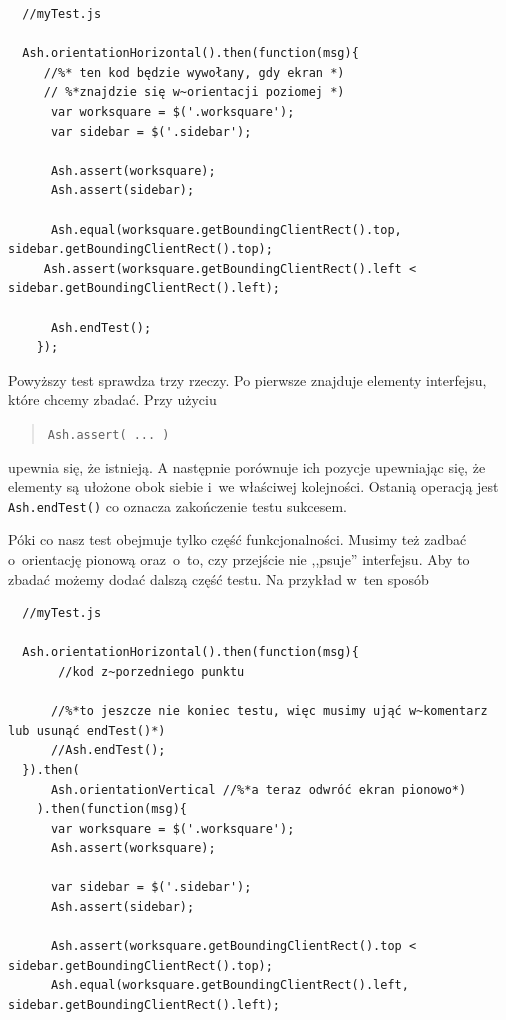 \documentclass[brudnopis]{xmgr}
\begin{document}
\begin{enumerate}
 \begin{lstlisting}
  //myTest.js

  Ash.orientationHorizontal().then(function(msg){
     //%* ten kod będzie wywołany, gdy ekran *) 
     // %*znajdzie się w~orientacji poziomej *)
      var worksquare = $('.worksquare');
      var sidebar = $('.sidebar');

      Ash.assert(worksquare);
      Ash.assert(sidebar);

      Ash.equal(worksquare.getBoundingClientRect().top, sidebar.getBoundingClientRect().top);
     Ash.assert(worksquare.getBoundingClientRect().left < sidebar.getBoundingClientRect().left);

      Ash.endTest();
    });  
\end{lstlisting}

Powyższy test sprawdza trzy rzeczy. Po pierwsze znajduje elementy interfejsu, które chcemy zbadać. Przy użyciu 

\begin{quote}
  \texttt{Ash.assert( ... )} 
\end{quote}

upewnia się, że istnieją. A następnie porównuje ich pozycje upewniając się, że elementy są ułożone obok siebie i~we właściwej kolejności. Ostanią operacją jest \texttt{Ash.endTest()} co oznacza zakończenie testu sukcesem.

Póki co nasz test obejmuje tylko część funkcjonalności. Musimy też zadbać o~orientację pionową oraz~o~to, czy przejście nie ,,psuje'' interfejsu. Aby to zbadać możemy dodać dalszą część testu. Na przykład w~ten sposób

 \begin{lstlisting}
  //myTest.js

  Ash.orientationHorizontal().then(function(msg){
       //kod z~porzedniego punktu

      //%*to jeszcze nie koniec testu, więc musimy ująć w~komentarz lub usunąć endTest()*)
      //Ash.endTest();
  }).then(
      Ash.orientationVertical //%*a teraz odwróć ekran pionowo*)
    ).then(function(msg){
      var worksquare = $('.worksquare');
      Ash.assert(worksquare);
      
      var sidebar = $('.sidebar');
      Ash.assert(sidebar);

      Ash.assert(worksquare.getBoundingClientRect().top < sidebar.getBoundingClientRect().top);
      Ash.equal(worksquare.getBoundingClientRect().left, sidebar.getBoundingClientRect().left);        


\end{lstlisting}
\end{enumerate}
\end{document}
